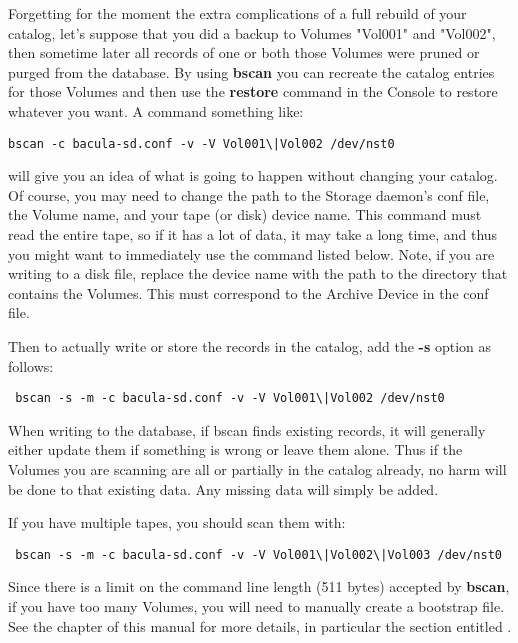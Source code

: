 Forgetting for the moment the extra complications of a full rebuild of 
your catalog, let's suppose that you did a backup to Volumes "Vol001" 
and "Vol002", then sometime later all records of one or both those
Volumes were pruned or purged from the
database. By using {\bf bscan} you can recreate the catalog entries for
those Volumes and then use the {\bf restore} command in the Console to restore
whatever you want. A command something like: 

\footnotesize
\begin{verbatim}
bscan -c bacula-sd.conf -v -V Vol001\|Vol002 /dev/nst0
\end{verbatim}
\normalsize

will give you an idea of what is going to happen without changing
your catalog. Of course, you may need to change the path to the Storage
daemon's conf file, the Volume name, and your tape (or disk) device name. This
command must read the entire tape, so if it has a lot of data, it may take a
long time, and thus you might want to immediately use the command listed
below. Note, if you are writing to a disk file, replace the device name with
the path to the directory that contains the Volumes. This must correspond to
the Archive Device in the conf file. 

Then to actually write or store the records in the catalog, add the {\bf -s}
option as follows: 

\footnotesize
\begin{verbatim}
 bscan -s -m -c bacula-sd.conf -v -V Vol001\|Vol002 /dev/nst0
\end{verbatim}
\normalsize

When writing to the database, if bscan finds existing records, it will
generally either update them if something is wrong or leave them alone. Thus
if the Volumes you are scanning are all or partially in the catalog already, no
harm will be done to that existing data. Any missing data will simply be
added. 

If you have multiple tapes, you should scan them with: 

\footnotesize
\begin{verbatim}
 bscan -s -m -c bacula-sd.conf -v -V Vol001\|Vol002\|Vol003 /dev/nst0
\end{verbatim}
\normalsize

Since there is a limit on the command line length (511 bytes) accepted
by {\bf bscan}, if you have too many Volumes, you will need to manually
create a bootstrap file.  See the 
chapter of this manual for more details, in particular the section
entitled .

